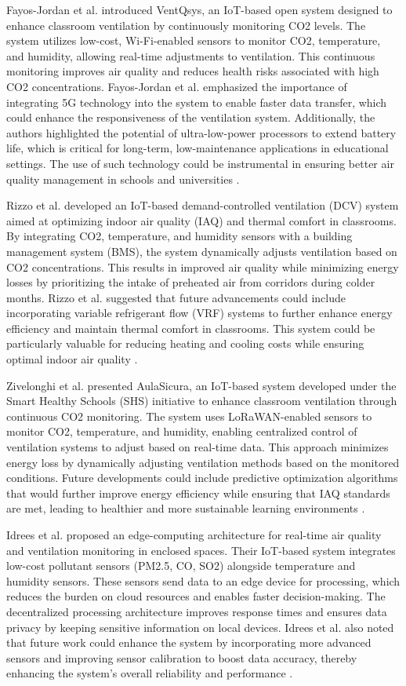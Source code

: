 Fayos-Jordan et al. introduced VentQsys, an IoT-based open system designed to enhance classroom ventilation by continuously monitoring CO2 levels. The system utilizes low-cost, Wi-Fi-enabled sensors to monitor CO2, temperature, and humidity, allowing real-time adjustments to ventilation. This continuous monitoring improves air quality and reduces health risks associated with high CO2 concentrations. Fayos-Jordan et al. emphasized the importance of integrating 5G technology into the system to enable faster data transfer, which could enhance the responsiveness of the ventilation system. Additionally, the authors highlighted the potential of ultra-low-power processors to extend battery life, which is critical for long-term, low-maintenance applications in educational settings. The use of such technology could be instrumental in ensuring better air quality management in schools and universities \cite{9}.

Rizzo et al. developed an IoT-based demand-controlled ventilation (DCV) system aimed at optimizing indoor air quality (IAQ) and thermal comfort in classrooms. By integrating CO2, temperature, and humidity sensors with a building management system (BMS), the system dynamically adjusts ventilation based on CO2 concentrations. This results in improved air quality while minimizing energy losses by prioritizing the intake of preheated air from corridors during colder months. Rizzo et al. suggested that future advancements could include incorporating variable refrigerant flow (VRF) systems to further enhance energy efficiency and maintain thermal comfort in classrooms. This system could be particularly valuable for reducing heating and cooling costs while ensuring optimal indoor air quality \cite{10}.

Zivelonghi et al. presented AulaSicura, an IoT-based system developed under the Smart Healthy Schools (SHS) initiative to enhance classroom ventilation through continuous CO2 monitoring. The system uses LoRaWAN-enabled sensors to monitor CO2, temperature, and humidity, enabling centralized control of ventilation systems to adjust based on real-time data. This approach minimizes energy loss by dynamically adjusting ventilation methods based on the monitored conditions. Future developments could include predictive optimization algorithms that would further improve energy efficiency while ensuring that IAQ standards are met, leading to healthier and more sustainable learning environments \cite{11}.

Idrees et al. proposed an edge-computing architecture for real-time air quality and ventilation monitoring in enclosed spaces. Their IoT-based system integrates low-cost pollutant sensors (PM2.5, CO, SO2) alongside temperature and humidity sensors. These sensors send data to an edge device for processing, which reduces the burden on cloud resources and enables faster decision-making. The decentralized processing architecture improves response times and ensures data privacy by keeping sensitive information on local devices. Idrees et al. also noted that future work could enhance the system by incorporating more advanced sensors and improving sensor calibration to boost data accuracy, thereby enhancing the system's overall reliability and performance \cite{12}.

